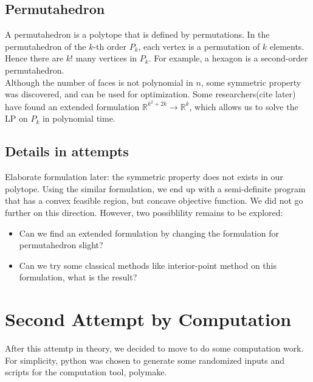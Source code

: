 \documentclass[12pt,letterpaper]{article}
\newcommand*{\R}{\mathbb{R}}
\begin{document}
\subsection{Permutahedron}
A permutahedron is a polytope that is defined by permutations. 
In the permutahedron of the $k$-th order $P_k$, each vertex is a permutation of $k$ elements.
Hence there are $k!$ many vertices in $P_k$. For example, a hexagon is a second-order permutahedron. \\
Although the number of faces is not polynomial in $n$,
some symmetric property was discovered, and can be used for optimization. Some researchers(cite later)
have found an extended formulation $\R^{k^2+2k} \rightarrow \R^{k}$, which allows us 
to solve the LP on $P_k$ in polynomial time. 

\subsection{Details in attempts}
Elaborate formulation later: the symmetric property does not exists in 
our polytope. Using the similar formulation, we end up with a 
semi-definite program that has a convex feasible region, 
but concave objective function. We did not go further on this direction. 
However, two possiblility remains to be explored:
\begin{itemize}
    \item Can we find an extended formulation by changing the formulation for permutahedron slight?
    \item Can we try some classical methods like interior-point method on this formulation, what is the result?
\end{itemize}

\section{Second Attempt by Computation}
After this attemtp in theory, we decided to move to do some computation work. 
For simplicity, python was chosen to generate some randomized inputs and scripts for 
the computation tool, polymake. 
\end{document}
